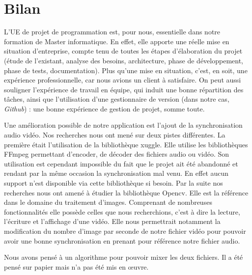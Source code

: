 \chapter{Bilan}


L'UE de projet de programmation est, pour nous, essentielle dans notre formation de Master informatique. En effet, elle apporte une réelle mise en situation d'entreprise, compte tenu de toutes les étapes d'élaboration du projet (étude de l'existant, analyse des besoins, architecture, phase de développement, phase de tests, documentation).
Plus qu'une mise en situation, c'est, en soit, une expérience professionnelle, car nous avions un client à satisfaire.
On peut aussi souligner l'expérience de travail en équipe, qui induit une bonne répartition des tâches, ainsi que l'utilisation d'une gestionnaire de version (dans notre cas, \textit{Github}) : une bonne expérience de gestion de projet, somme toute.

Une amélioration possible de notre application est l'ajout de la synchronisation audio vidéo. Nos recherches nous ont mené sur deux pistes différentes. La première était l'utilisation de la bibliothèque xuggle. Elle utilise les bibliothèques FFmpeg permettant d'encoder, de décoder des fichiers audio ou vidéo. Son utilisation est cependant impossible du fait que le projet ait été abandonné et rendant par la même occasion la synchronisation mal venu. En effet aucun support n'est disponible via cette bibliothèque si besoin. 
Par la suite nos recherches nous ont amené à étudier la bibliothèque Opencv. Elle est la référence dans le domaine du traitement d'images. Comprenant de nombreuses fonctionnalités elle possède celles que nous recherchions, c'est à dire la lecture, l'écriture et l'affichage d’une vidéo. Elle nous permettrait notamment la modification du nombre d'image par seconde de notre fichier vidéo pour pouvoir avoir une bonne synchronisation en prenant pour référence notre fichier audio.

Nous avons pensé à un algorithme pour pouvoir mixer les deux fichiers. Il a été pensé sur papier mais n'a pas été mis en œuvre.

